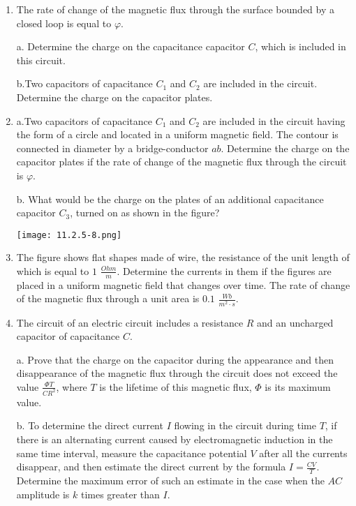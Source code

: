 \documentclass{article}
\begin{document}
\begin{enumerate}[label=11.2.\arabic*]
\item The rate of change of the magnetic flux through the surface bounded by a closed loop is equal to $\varphi$.

a. Determine the charge on the capacitance capacitor $C$, which is included in this circuit. 

b.Two capacitors of capacitance $C_1$ and $C_2$ are included in the circuit. Determine the charge on the capacitor plates.

\item a.Two capacitors of capacitance $C_1$ and $C_2$ are included in the circuit having the form of a circle and located in a uniform magnetic field. The contour is connected in diameter by a bridge-conductor $ab$. Determine the charge on the capacitor plates if the rate of change of the magnetic flux through the circuit is $\varphi$.

b. What would be the charge on the plates of an additional capacitance capacitor $C_3$, turned on as shown in the figure?

\begin{center}
    \texttt{[image: 11.2.5-8.png]}
\end{center}

\item The figure shows flat shapes made of wire, the resistance of the unit length of which is equal to $1$ $\frac{Ohm}{m}$. Determine the currents in them if the figures are placed in a uniform magnetic field that changes over time. The rate of change of the magnetic flux through a unit area is $0.1$ $\frac{Wb}{m^2 \cdot s}$.

\item The circuit of an electric circuit includes a resistance $R$ and an uncharged capacitor of capacitance $C$.

a. Prove that the charge on the capacitor during the appearance and then disappearance of the magnetic flux through the circuit does not exceed the value $\frac{\Phi T}{C R^2}$, where $T$ is the lifetime of this magnetic flux, $\Phi$ is its maximum value.

b. To determine the direct current $I$ flowing in the circuit during time $T$, if there is an alternating current caused by electromagnetic induction in the same time interval, measure the capacitance potential $V$ after all the currents disappear, and then estimate the direct current by the formula $I = \frac{CV}{T}$. Determine the maximum error of such an estimate in the case when the $AC$ amplitude is $k$ times greater than $I$.


\end{enumerate}
\end{document}
